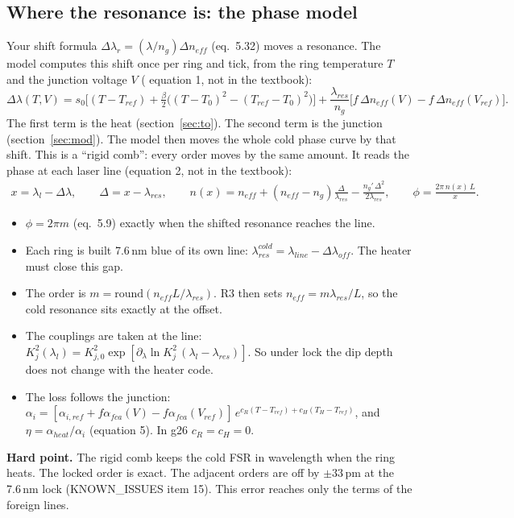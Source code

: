 \documentclass[11pt,letterpaper]{article}
\newcommand{\cd}[1]{\path{#1}}
\newcommand{\eq}[1]{(eq.~#1)}
\newcommand{\hard}[1]{\par\textbf{Hard point.} #1\par}
\begin{document}
\subsection{Where the resonance is: the phase model}
Your shift formula $\Delta\lambda_r=(\lambda/n_g)\Delta n_{eff}$ \eq{5.32} moves a resonance. The model computes this
shift once per ring and tick, from the ring temperature $T$ and the junction voltage $V$ (\cd{phase.py} equation 1,
not in the textbook):
\[
\Delta\lambda(T,V)=s_0\Big[(T-T_{ref})+\tfrac{\beta}{2}\big((T-T_0)^2-(T_{ref}-T_0)^2\big)\Big]+\frac{\lambda_{res}}{n_g}\Big[f\,\Delta n_{eff}(V)-f\,\Delta n_{eff}(V_{ref})\Big].
\]
The first term is the heat (section~\ref{sec:to}). The second term is the junction (section~\ref{sec:mod}). The model
then moves the whole cold phase curve by that shift. This is a ``rigid comb'': every order moves by the same amount.
It reads the phase at each laser line (equation 2, not in the textbook):
\begin{gather*}
x=\lambda_l-\Delta\lambda,\qquad \Delta=x-\lambda_{res},\qquad
n(x)=n_{eff}+(n_{eff}-n_g)\frac{\Delta}{\lambda_{res}}-\frac{n_g'\,\Delta^2}{2\lambda_{res}},\qquad \phi=\frac{2\pi\,n(x)\,L}{x}.
\end{gather*}
\begin{itemize}
  \item $\phi=2\pi m$ \eq{5.9} exactly when the shifted resonance reaches the line.
  \item Each ring is built 7.6\,nm blue of its own line: $\lambda_{res}^{cold}=\lambda_{line}-\Delta\lambda_{off}$.
  The heater must close this gap.
  \item The order is $m=\mathrm{round}(n_{eff}L/\lambda_{res})$. R3 then sets $n_{eff}=m\lambda_{res}/L$, so the cold
  resonance sits exactly at the offset.
  \item The couplings are taken at the line: $K_j^2(\lambda_l)=K_{j,0}^2\exp[\partial_\lambda\ln K_j^2\,(\lambda_l-\lambda_{res})]$.
  So under lock the dip depth does not change with the heater code.
  \item The loss follows the junction:
  $\alpha_i=[\alpha_{i,ref}+f\alpha_{fca}(V)-f\alpha_{fca}(V_{ref})]\,e^{c_R(T-T_{ref})+c_H(T_H-T_{ref})}$, and
  $\eta=\alpha_{heat}/\alpha_i$ (equation 5). In g26 $c_R=c_H=0$.
\end{itemize}

\hard{The rigid comb keeps the cold FSR in wavelength when the ring heats. The locked order is exact. The adjacent
orders are off by $\pm33$\,pm at the 7.6\,nm lock (KNOWN\_ISSUES item 15). This error reaches only the terms of the
foreign lines.}
\end{document}
